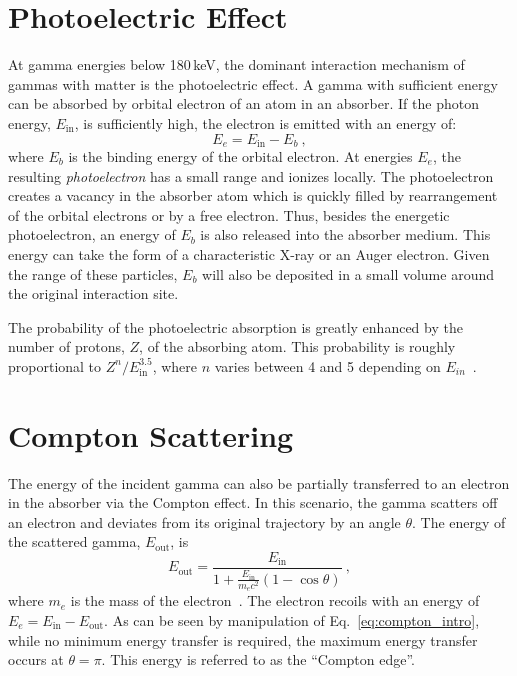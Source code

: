 \section{Photoelectric Effect}
At gamma energies below 180\,keV, the dominant interaction mechanism of gammas with matter is the photoelectric effect. A gamma with sufficient energy can be absorbed by orbital electron of an atom in an absorber. If the photon energy, $E_\text{in}$, is sufficiently high,  the electron is emitted with an energy of: 
\begin{equation}
	E_e = E_\text{in} - E_b~, 
	\label{eq:photoelectric_intro}
\end{equation}
where $E_b$ is the binding energy of the orbital electron. At energies $E_e$, the resulting \textit{photoelectron} has a small range and ionizes locally. The photoelectron creates a vacancy in the absorber atom which is quickly filled by rearrangement of the orbital electrons or by a free electron. Thus, besides the energetic photoelectron, an energy of $E_b$ is also released into the absorber medium. This energy can take the form of a characteristic X-ray or an Auger electron. Given the range of these particles, $E_b$ will also be deposited in a small volume around the original interaction site.

The probability of the photoelectric absorption is greatly enhanced by the number of protons, $Z$, of the absorbing atom. This probability is roughly proportional to $Z^n/E_\text{in}^{3.5}$, where $n$ varies between 4 and 5 depending on $E_{in}$~\cite{knoll}.

\section{Compton Scattering}
The energy of the incident gamma can also be partially transferred to an electron in the absorber via the Compton effect. In this scenario, the gamma scatters off an electron and deviates from its original trajectory by an angle $\theta$. The energy of the scattered gamma, $E_\text{out}$, is
\begin{equation}
	E_\text{out} = \frac{E_\text{in}}{1 + \frac{E_\text{in}}{m_ec^2}(1 - \cos\theta)}~,
	\label{eq:compton_intro}
\end{equation}
where $m_e$ is the mass of the electron~\cite{compton}. The electron recoils with an energy of $E_e = E_\text{in} - E_\text{out}$. As can be seen by manipulation of Eq.~\ref{eq:compton_intro}, while no minimum energy transfer is required, the maximum energy transfer occurs at $\theta = \pi$. This energy is referred to as the ``Compton edge''.

